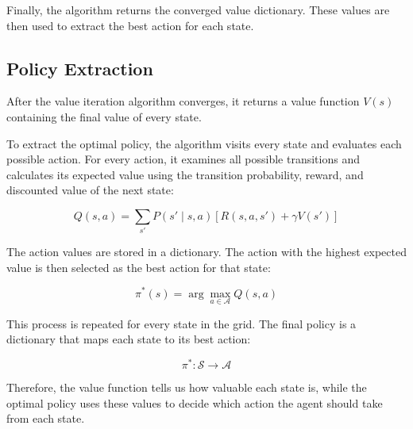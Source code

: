 \documentclass{scrartcl}
\theoremstyle{mytheoremstyle}
\theoremstyle{mytheoremstyle}
\theoremstyle{myproblemstyle}
\begin{document}
Finally, the algorithm returns the converged value dictionary. These values are
then used to extract the best action for each state.

\subsection{Policy Extraction}

After the value iteration algorithm converges, it returns a value function
\(V(s)\) containing the final value of every state.

To extract the optimal policy, the algorithm visits every state and evaluates
each possible action. For every action, it examines all possible transitions
and calculates its expected value using the transition probability, reward, and
discounted value of the next state:

\[
    Q(s,a) =
    \sum_{s'}
    P(s' \mid s,a)
    \left[
        R(s,a,s') + \gamma V(s')
        \right]
\]

The action values are stored in a dictionary. The action with the highest
expected value is then selected as the best action for that state:

\[
    \pi^*(s) =
    \arg\max_{a \in \mathcal{A}} Q(s,a)
\]

This process is repeated for every state in the grid. The final policy is a
dictionary that maps each state to its best action:

\[
    \pi^* : \mathcal{S} \rightarrow \mathcal{A}
\]

Therefore, the value function tells us how valuable each state is, while the
optimal policy uses these values to decide which action the agent should take
from each state.





\nocite{sutton2018reinforcement}
\end{document}
